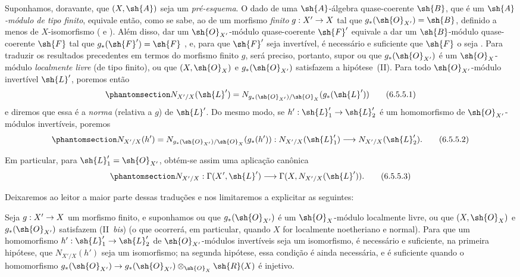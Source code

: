 \documentclass[oneside,10pt]{amsart}
\makeatletter
\newcommand{\ega@arrow}[2]{\mathchoice{#1}{#2}{#2}{#2}}
\renewcommand{\to}{\ega@arrow{\longrightarrow}{\rightarrow}}
\let\EGAOriginalLabel\label
\renewcommand{\label}[1]{\phantomsection\EGAOriginalLabel{#1}}
\makeatother
\begin{document}
\begin{env}[6.5.5]
\label{II.6.5.5}
Suponhamos, doravante, que $(X,\sh{A})$ seja um \emph{pré-esquema}.
O dado de uma $\sh{A}$-álgebra quase-coerente $\sh{B}$, que é um \emph{$\sh{A}$-módulo de tipo finito}, equivale então, como se sabe, ao de um morfismo \emph{finito} $g:X'\to X$ tal que $g_*(\sh{O}_{X'})=\sh{B}$, definido a menos de $X$-isomorfismo ( e ).
Além disso, dar um $\sh{O}_{X'}$-módulo quase-coerente $\sh{F}'$ equivale a dar um $\sh{B}$-módulo quase-coerente $\sh{F}$ tal que $g_*(\sh{F}')=\sh{F}$ , e, para que $\sh{F}'$ seja invertível, é necessário e suficiente que $\sh{F}$ o seja .
Para traduzir os resultados precedentes em termos do morfismo finito $g$, será preciso, portanto, supor ou que $g_*(\sh{O}_{X'})$ é um $\sh{O}_X$-módulo \emph{localmente livre} (de tipo finito), ou que $(X,\sh{O}_X)$ e $g_*(\sh{O}_{X'})$ satisfazem a hipótese~(II).
Para todo $\sh{O}_{X'}$-módulo invertível $\sh{L}'$, poremos então
\[
\label{II.6.5.5.1}
  N_{X'/X}(\sh{L}') = N_{g_*(\sh{O}_{X'})/\sh{O}_X}(g_*(\sh{L}'))
\tag{6.5.5.1}
\]
e diremos que essa é a \emph{norma} (relativa a $g$) de $\sh{L}'$.
Do mesmo modo, se $h':\sh{L}'_1\to\sh{L}'_2$ é um homomorfismo de $\sh{O}_{X'}$-módulos invertíveis, poremos
\[
\label{II.6.5.5.2}
  N_{X'/X}(h') = N_{g_*(\sh{O}_{X'})/\sh{O}_X}(g_*(h')) : N_{X'/X}(\sh{L}'_1)\to N_{X'/X}(\sh{L}'_2).
\tag{6.5.5.2}
\]

Em particular, para $\sh{L}'_1=\sh{O}_{X'}$, obtém-se assim uma aplicação canônica
\[
\label{II.6.5.5.3}
  N_{X'/X} : \Gamma(X',\sh{L}') \to \Gamma(X,N_{X'/X}(\sh{L}')).
\tag{6.5.5.3}
\]

Deixaremos ao leitor a maior parte dessas traduções e nos limitaremos a explicitar as seguintes:
\end{env}

\begin{proposition}[6.5.6]
\label{II.6.5.6}
Seja $g:X'\to X$ um morfismo finito, e suponhamos ou que $g_*(\sh{O}_{X'})$ é um $\sh{O}_X$-módulo localmente livre, ou que $(X,\sh{O}_X)$ e $g_*(\sh{O}_{X'})$ satisfazem (II~\emph{bis}) (o que ocorrerá, em particular, quando $X$ for localmente noetheriano e normal).
Para que um homomorfismo $h':\sh{L}'_1\to\sh{L}'_2$ de $\sh{O}_{X'}$-módulos invertíveis seja um isomorfismo, é necessário e suficiente, na primeira hipótese, que $N_{X'/X}(h')$ seja um isomorfismo;
na segunda hipótese, essa condição é ainda necessária, e é suficiente quando o homomorfismo $g_*(\sh{O}_{X'})\to g_*(\sh{O}_{X'})\otimes_{\sh{O}_X}\sh{R}(X)$ é injetivo.
\end{proposition}
\end{document}
